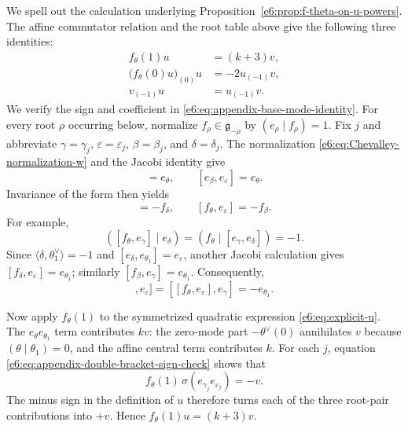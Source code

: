 \documentclass[11pt,reqno]{amsart}
\theoremstyle{definition}
\theoremstyle{remark}
\begin{document}
We spell out the calculation underlying
Proposition~\ref{e6:prop:f-theta-on-u-powers}.  The affine commutator relation and
the root table above give the following three identities:
\begin{align}
  f_\theta(1)u&=(k+3)v,
  \label{e6:eq:appendix-base-mode-identity}\\
  \bigl(f_\theta(0)u\bigr)_{(0)}u
  &=-2u_{(-1)}v,
  \label{e6:eq:appendix-zero-mode-on-u}\\
  v_{(-1)}u&=u_{(-1)}v.
  \label{e6:eq:appendix-v-commutes-u}
\end{align}
We verify the sign and coefficient in
\eqref{e6:eq:appendix-base-mode-identity}.  For every root $\rho$ occurring
below, normalize $f_\rho\in\mathfrak g_{-\rho}$ by
$(e_\rho\mid f_\rho)=1$.  Fix $j$ and abbreviate
$\gamma=\gamma_j$, $\varepsilon=\varepsilon_j$,
$\beta=\beta_j$, and $\delta=\delta_j$.  The normalization
\eqref{e6:eq:Chevalley-normalization-w} and the Jacobi identity give
\begin{equation*}
 [e_\delta,e_\gamma]=e_\theta,
 \qquad
 [e_\beta,e_\varepsilon]=e_\theta.
\end{equation*}
Invariance of the form then yields
\begin{equation*}
 [f_\theta,e_\gamma]=-f_\delta,
 \qquad
 [f_\theta,e_\varepsilon]=-f_\beta.
\end{equation*}
For example,
\begin{equation*}
 ([f_\theta,e_\gamma]\mid e_\delta)
 =(f_\theta\mid[e_\gamma,e_\delta])=-1.
\end{equation*}
Since $\langle\delta,\theta_1^\vee\rangle=-1$ and
$[e_\delta,e_{\theta_1}]=e_\varepsilon$, another Jacobi calculation gives
$[f_\delta,e_\varepsilon]=e_{\theta_1}$; similarly
$[f_\beta,e_\gamma]=e_{\theta_1}$.  Consequently,
\begin{equation}
 [[f_\theta,e_\gamma],e_\varepsilon]
 =[[f_\theta,e_\varepsilon],e_\gamma]
 =-e_{\theta_1}.
 \label{e6:eq:appendix-double-bracket-sign-check}
\end{equation}

Now apply $f_\theta(1)$ to the symmetrized quadratic expression
\eqref{e6:eq:explicit-u}.  The $e_\theta e_{\theta_1}$ term contributes
$kv$: the zero-mode part $-\theta^\vee(0)$ annihilates $v$ because
$(\theta\mid\theta_1)=0$, and the affine central term contributes $k$.
For each $j$, equation
\eqref{e6:eq:appendix-double-bracket-sign-check} shows that
\begin{equation*}
 f_\theta(1)\,\sigma(e_{\gamma_j}e_{\varepsilon_j})=-v.
\end{equation*}
The minus sign in the definition of $u$ therefore turns each of the three
root-pair contributions into $+v$.  Hence
$f_\theta(1)u=(k+3)v$.
\end{document}
